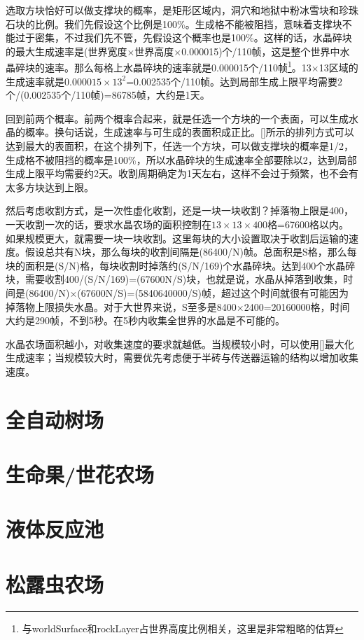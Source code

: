 选取方块恰好可以做支撑块的概率，是矩形区域内，洞穴和地狱中粉冰雪块和珍珠石块的比例。我们先假设这个比例是100\%。生成格不能被阻挡，意味着支撑块不能过于密集，不过我们先不管，先假设这个概率也是100\%。这样的话，水晶碎块的最大生成速率是(世界宽度$\times$世界高度$\times$0.000015)个/110帧，这是整个世界中水晶碎块的速率。那么每格上水晶碎块的速率就是0.000015个/110帧\footnote{与worldSurface和rockLayer占世界高度比例相关，这里是非常粗略的估算}。13$\times$13区域的生成速率就是$0.000015\times 13^2$=0.002535个/110帧。达到局部生成上限平均需要2个/(0.002535个/110帧)=86785帧，大约是1天。

回到前两个概率。前两个概率合起来，就是任选一个方块的一个表面，可以生成水晶的概率。换句话说，生成速率与可生成的表面积成正比。\autoref{}所示的排列方式可以达到最大的表面积，在这个排列下，任选一个方块，可以做支撑块的概率是1/2，生成格不被阻挡的概率是100\%，所以水晶碎块的生成速率全部要除以2，达到局部生成上限平均需要约2天。收割周期确定为1天左右，这样不会过于频繁，也不会有太多方块达到上限。

然后考虑收割方式，是一次性虚化收割，还是一块一块收割？掉落物上限是400，一天收割一次的话，要求水晶农场的面积控制在$13\times 13\times 400$格=67600格以内。如果规模更大，就需要一块一块收割。这里每块的大小设置取决于收割后运输的速度。假设总共有N块，那么每块的收割间隔是(86400/N)帧。总面积是S格，那么每块的面积是(S/N)格，每块收割时掉落约(S/N/169)个水晶碎块。达到400个水晶碎块，需要收割400/(S/N/169)=(67600N/S)块，也就是说，水晶从掉落到收集，时间是(86400/N)$\times$(67600N/S)=(5840640000/S)帧，超过这个时间就很有可能因为掉落物上限损失水晶。对于大世界来说，S至多是8400$\times$2400=20160000格，时间大约是290帧，不到5秒。在5秒内收集全世界的水晶是不可能的。

水晶农场面积越小，对收集速度的要求就越低。当规模较小时，可以使用\autoref{}最大化生成速率；当规模较大时，需要优先考虑便于半砖与传送器运输的结构以增加收集速度。

\section{全自动树场}

\section{生命果/世花农场}

\section{液体反应池}

\section{松露虫农场}

